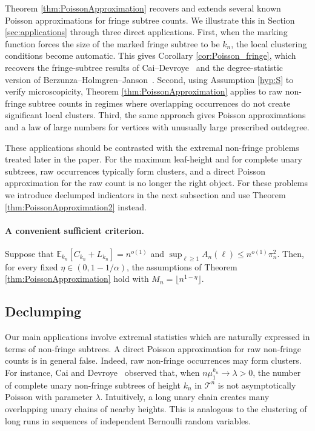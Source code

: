 \documentclass[a4paper,11pt]{article}
\newcommand{\E}{\mathbb{E}}
\DeclareRobustCommand{\1}{\mathbf{1}}
\begin{document}
Theorem \ref{thm:PoissonApproximation} recovers and extends several known
Poisson approximations for fringe subtree counts. We illustrate this in
Section \ref{sec:applications} through three direct applications. First, when
the marking function forces the size of the marked fringe subtree to be
$k_n$, the local clustering conditions become automatic. This gives
Corollary \ref{cor:Poisson_fringe}, which recovers the fringe-subtree results
of Cai--Devroye~\cite{CD17} and the degree-statistic version of
Berzunza--Holmgren--Janson~\cite{BHJ26}. Second, using Assumption
\ref{hyp:S} to verify microscopicity, Theorem
\ref{thm:PoissonApproximation} applies to raw non-fringe subtree counts in
regimes where overlapping occurrences do not create significant local
clusters. Third, the same approach gives Poisson approximations and a law of
large numbers for vertices with unusually large prescribed outdegree.

These applications should be contrasted with the extremal non-fringe problems
treated later in the paper. For the maximum leaf-height and for complete
unary subtrees, raw occurrences typically form clusters, and a direct Poisson
approximation for the raw count is no longer the right object. For these
problems we introduce declumped indicators in the next subsection and use
Theorem \ref{thm:PoissonApproximation2} instead.


\paragraph{A convenient sufficient criterion.}
Suppose that $\E_{k_n}[C_{k_n}+L_{k_n}]=n^{o(1)}$ and $
  \sup_{\ell\ge1}A_n(\ell)\le n^{o(1)}\pi_n^2$.
Then, for every fixed $\eta\in(0,1-1/\alpha)$, the assumptions of Theorem
\ref{thm:PoissonApproximation} hold with
$M_n=\lfloor n^{1-\eta}\rfloor$.


\subsection{Declumping}

Our main applications involve extremal statistics which are naturally expressed
in terms of non-fringe subtrees.  A direct Poisson approximation for raw non-fringe counts is in general false.
Indeed, raw non-fringe occurrences may form clusters. For instance, Cai and
Devroye~\cite[Lemma~5.5]{CD17} observed that, when
$n\mu_1^{k_n}\to\lambda>0$, the number of complete unary non-fringe subtrees
of height $k_n$ in $\mathcal T^n$ is not asymptotically Poisson with parameter
$\lambda$. Intuitively, a long unary chain creates many overlapping unary
chains of nearby heights. This is analogous to the clustering of long runs in
sequences of independent Bernoulli random variables.
\end{document}
